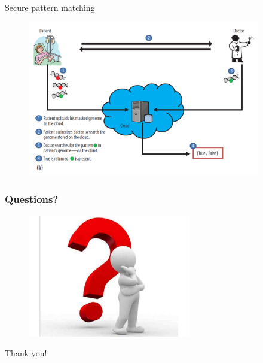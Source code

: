 \documentclass[10pt,xcolor=table]{beamer}
\begin{document}
\begin{frame}{Secure pattern matching}
\begin{figure}
  \centering
  \includegraphics[width=4.0in]{doctorpatient}
\end{figure}
\end{frame}

\begin{frame}\frametitle{Questions?}
	\begin{figure}[t]
		\centering
		\includegraphics[width=2.8in]{questions}
	\end{figure}
	\centering
	\color{blue}
	\Huge{Thank you!}
\end{frame}
\end{document}
